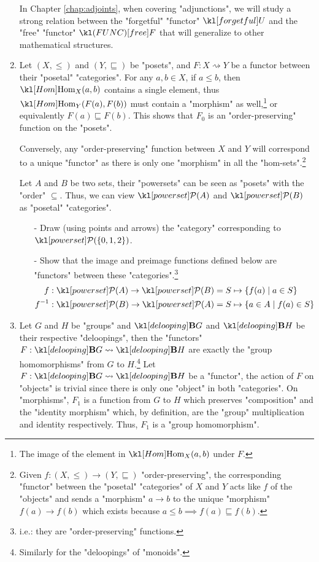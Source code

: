 \documentclass[main.tex]{subfiles}
\begin{document}
\begin{exmps}
\begin{enumerate}
		In Chapter \ref{chap:adjoints}, when covering "adjunctions", we will study a strong relation between the "forgetful" "functor" $\forget$ and the "free" "functor" $\free$ that will generalize to other mathematical structures.
		
		\item Let $(X, \leq)$ and $(Y, \sqsubseteq)$ be "posets", and $F:X\rightsquigarrow Y$ be a functor between their "posetal" "categories". For any $a, b \in X$, if $a\leq b$, then $\Hom_X(a,b)$ contains a single element, thus $\Hom_Y(F(a), F(b))$ must contain a "morphism" as well,\footnote{The image of the element in $\Hom_X(a,b)$ under $F$.} or equivalently $F(a) \sqsubseteq F(b)$. This shows that $F_0$ is an "order-preserving" function on the "posets".
		
		Conversely, any "order-preserving" function between $X$ and $Y$ will correspond to a unique "functor" as there is only one "morphism" in all the "hom-sets".\footnote{Given $f:(X,\leq) \rightarrow (Y,\sqsubseteq)$ "order-preserving", the corresponding "functor" between the "posetal" "categories" of $X$ and $Y$ acts like $f$ of the "objects" and sends a "morphism" $a \rightarrow b$ to the unique "morphism" $f(a) \rightarrow f(b)$ which exists because $a\leq b \implies f(a) \sqsubseteq f(b)$.}
		\begin{exer}\label{exer:catfunc:imagefunctors}
			Let $A$ and $B$ be two sets, their "powersets" can be seen as "posets" with the "order" $\subseteq$. Thus, we can view $\mP(A)$ and $\mP(B)$ as "posetal" "categories".
			\begin{itemize}
				\item[-] Draw (using points and arrows) the "category" corresponding to $\mP(\{0,1,2\})$.
				\item[-] Show that the image and preimage functions defined below are "functors" between these "categories".\footnote{i.e.: they are "order-preserving" functions.}
				\begin{align*}
				f: \mP(A) \rightarrow \mP(B)&= S \mapsto \{f(a) \mid a \in S\}\\ f^{-1}: \mP(B) \rightarrow \mP(A) &= S \mapsto \{a \in A \mid f(a) \in S\}
				\end{align*}
			\end{itemize}
		\end{exer}
		\item Let $G$ and $H$ be "groups" and $\deloop{G}$ and $\deloop{H}$ be their respective "deloopings", then the "functors" $F: \deloop{G} \rightsquigarrow \deloop{H}$ are exactly the "group homomorphisms" from $G$ to $H$.\footnote{Similarly for the "deloopings" of "monoids".} Let $F:\deloop{G} \rightsquigarrow \deloop{H}$ be a "functor", the action of $F$ on "objects" is trivial since there is only one "object" in both "categories". On "morphisms", $F_1$ is a function from $G$ to $H$ which preserves "composition" and the "identity morphism" which, by definition, are the "group" multiplication and identity respectively. Thus, $F_1$ is a "group homomorphism".
		

\end{enumerate}
\end{exmps}
\end{document}
